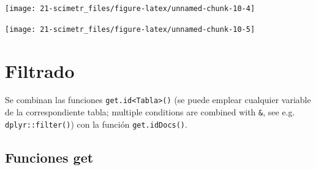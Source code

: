 \documentclass[]{book}
\begin{document}
\begin{flushleft}\texttt{[image: 21-scimetr\_files/figure-latex/unnamed-chunk-10-4]} \end{flushleft}

\begin{flushleft}\texttt{[image: 21-scimetr\_files/figure-latex/unnamed-chunk-10-5]} \end{flushleft}

\section{Filtrado}\label{filtrado-1}

Se combinan las funciones
\texttt{get.id\textless{}Tabla\textgreater{}()} (se puede emplear
cualquier variable de la correspondiente tabla; multiple conditions are
combined with \texttt{\&}, see e.g. \texttt{dplyr::filter()}) con la
función \texttt{get.idDocs()}.

\subsection{Funciones get}\label{funciones-get}
\end{document}
